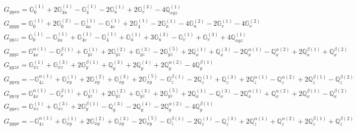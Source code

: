 \documentclass[fleqn,8pt,landscape]{jsarticle}
\begin{document}
\begin{align*}
& G_{yyxx} = \mathbb{G}_{0}^{(1)} + 2 \mathbb{G}_{4u}^{(1)} - \mathbb{G}_{4}^{(1)} - 2 \mathbb{G}_{u}^{(1)} + 2 \mathbb{G}_{v}^{(3)} - 4 \mathbb{Q}_{xyz}^{(1)} \\
& G_{yyyy} = \mathbb{G}_{0}^{(1)} + 2 \mathbb{G}_{0}^{(2)} - \mathbb{G}_{4u}^{(1)} - \mathbb{G}_{4v}^{(1)} + 2 \mathbb{G}_{4}^{(1)} - 2 \mathbb{G}_{u}^{(1)} - 4 \mathbb{G}_{u}^{(2)} - 2 \mathbb{G}_{v}^{(1)} - 4 \mathbb{G}_{v}^{(2)} \\
& G_{yyzz} = \mathbb{G}_{0}^{(1)} - \mathbb{G}_{4u}^{(1)} + \mathbb{G}_{4v}^{(1)} - \mathbb{G}_{4}^{(1)} + \mathbb{G}_{u}^{(1)} + 3 \mathbb{G}_{u}^{(3)} - \mathbb{G}_{v}^{(1)} + \mathbb{G}_{v}^{(3)} + 4 \mathbb{Q}_{xyz}^{(1)} \\
& G_{yyyz} = \mathbb{G}_{4x}^{\alpha(1)} - \mathbb{G}_{x}^{\beta(1)} + \mathbb{G}_{yz}^{(1)} + 2 \mathbb{G}_{yz}^{(2)} + \mathbb{G}_{yz}^{(3)} - 2 \mathbb{G}_{yz}^{(5)} + 2 \mathbb{Q}_{x}^{(1)} + \mathbb{Q}_{x}^{(3)} - 2 \mathbb{Q}_{x}^{\alpha(1)} - \mathbb{Q}_{x}^{\alpha(2)} + 2 \mathbb{Q}_{x}^{\beta(1)} + \mathbb{Q}_{x}^{\beta(2)} \\
& G_{yyzx} = \mathbb{G}_{xz}^{(1)} + \mathbb{G}_{xz}^{(3)} + 2 \mathbb{G}_{y}^{\beta(1)} + \mathbb{Q}_{y}^{(3)} + 2 \mathbb{Q}_{y}^{(4)} + 2 \mathbb{Q}_{y}^{\alpha(2)} - 4 \mathbb{Q}_{y}^{\beta(1)} \\
& G_{yyxy} = - \mathbb{G}_{4z}^{\alpha(1)} + \mathbb{G}_{xy}^{(1)} + 2 \mathbb{G}_{xy}^{(2)} + \mathbb{G}_{xy}^{(3)} + 2 \mathbb{G}_{xy}^{(5)} - \mathbb{G}_{z}^{\beta(1)} - 2 \mathbb{Q}_{z}^{(1)} + \mathbb{Q}_{z}^{(3)} + 2 \mathbb{Q}_{z}^{\alpha(1)} - \mathbb{Q}_{z}^{\alpha(2)} + 2 \mathbb{Q}_{z}^{\beta(1)} - \mathbb{Q}_{z}^{\beta(2)} \\
& G_{yyzy} = \mathbb{G}_{4x}^{\alpha(1)} - \mathbb{G}_{x}^{\beta(1)} + \mathbb{G}_{yz}^{(1)} + 2 \mathbb{G}_{yz}^{(2)} + \mathbb{G}_{yz}^{(3)} + 2 \mathbb{G}_{yz}^{(5)} + 2 \mathbb{Q}_{x}^{(1)} - \mathbb{Q}_{x}^{(3)} - 2 \mathbb{Q}_{x}^{\alpha(1)} + \mathbb{Q}_{x}^{\alpha(2)} + 2 \mathbb{Q}_{x}^{\beta(1)} - \mathbb{Q}_{x}^{\beta(2)} \\
& G_{yyxz} = \mathbb{G}_{xz}^{(1)} + \mathbb{G}_{xz}^{(3)} + 2 \mathbb{G}_{y}^{\beta(1)} - \mathbb{Q}_{y}^{(3)} - 2 \mathbb{Q}_{y}^{(4)} - 2 \mathbb{Q}_{y}^{\alpha(2)} - 4 \mathbb{Q}_{y}^{\beta(1)} \\
& G_{yyyx} = - \mathbb{G}_{4z}^{\alpha(1)} + \mathbb{G}_{xy}^{(1)} + 2 \mathbb{G}_{xy}^{(2)} + \mathbb{G}_{xy}^{(3)} - 2 \mathbb{G}_{xy}^{(5)} - \mathbb{G}_{z}^{\beta(1)} - 2 \mathbb{Q}_{z}^{(1)} - \mathbb{Q}_{z}^{(3)} + 2 \mathbb{Q}_{z}^{\alpha(1)} + \mathbb{Q}_{z}^{\alpha(2)} + 2 \mathbb{Q}_{z}^{\beta(1)} + \mathbb{Q}_{z}^{\beta(2)} \\

\end{align*}
\end{document}
